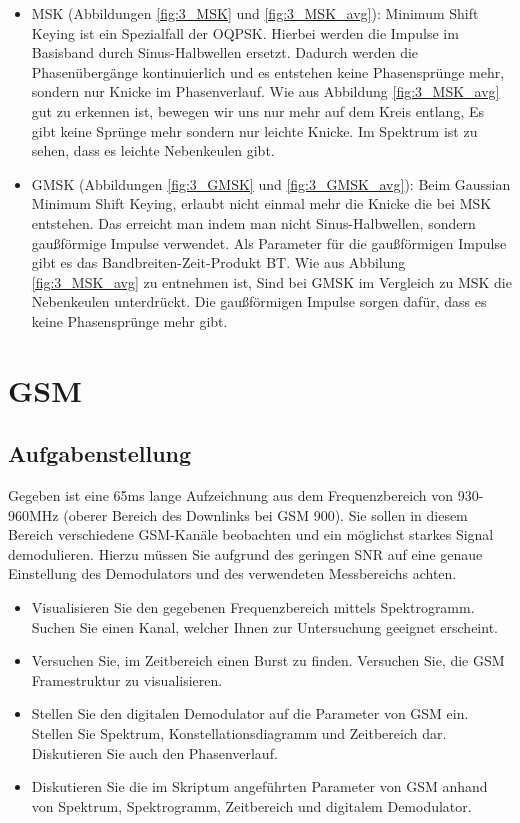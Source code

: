\documentclass[12pt,a4paper,ngerman]{article}
\begin{document}
\begin{itemize}
\item MSK (Abbildungen \ref{fig:3_MSK} und \ref{fig:3_MSK_avg}): Minimum Shift Keying ist ein Spezialfall der OQPSK. Hierbei werden die Impulse im Basisband durch Sinus-Halbwellen ersetzt. Dadurch werden die Phasenübergänge kontinuierlich und es entstehen keine Phasensprünge mehr, sondern nur Knicke im Phasenverlauf. Wie aus Abbildung \ref{fig:3_MSK_avg} gut zu erkennen ist, bewegen wir uns nur mehr auf dem Kreis entlang, Es gibt keine Sprünge mehr sondern nur leichte Knicke. Im Spektrum ist zu sehen, dass es leichte Nebenkeulen gibt.
\item GMSK (Abbildungen \ref{fig:3_GMSK} und \ref{fig:3_GMSK_avg}): Beim Gaussian Minimum Shift Keying, erlaubt nicht einmal mehr die Knicke die bei MSK entstehen. Das erreicht man indem man nicht Sinus-Halbwellen, sondern gaußförmige Impulse verwendet. Als Parameter für die gaußförmigen Impulse gibt es das Bandbreiten-Zeit-Produkt BT. Wie aus Abbilung \ref{fig:3_MSK_avg} zu entnehmen ist, Sind bei GMSK im Vergleich zu MSK die Nebenkeulen unterdrückt. Die gaußförmigen Impulse sorgen dafür, dass es keine Phasensprünge mehr gibt.
\end{itemize}


\pagebreak



\section{GSM}
\subsection{Aufgabenstellung}
Gegeben ist eine 65ms lange Aufzeichnung aus dem Frequenzbereich von 930-960MHz (oberer Bereich des Downlinks bei GSM 900). Sie sollen in diesem Bereich verschiedene GSM-Kanäle beobachten und ein möglichst starkes Signal demodulieren. Hierzu müssen Sie aufgrund des geringen SNR auf eine genaue Einstellung des Demodulators und des verwendeten Messbereichs achten. 
\begin{itemize}
\item Visualisieren Sie den gegebenen Frequenzbereich mittels Spektrogramm. Suchen Sie einen Kanal, welcher Ihnen zur Untersuchung geeignet erscheint.
\item Versuchen Sie, im Zeitbereich einen Burst zu finden. Versuchen Sie, die GSM Framestruktur zu visualisieren.
\item Stellen Sie den digitalen Demodulator auf die Parameter von GSM ein. Stellen Sie Spektrum, Konstellationsdiagramm und Zeitbereich dar. Diskutieren Sie auch den Phasenverlauf. 
\item Diskutieren Sie die im Skriptum angeführten Parameter von GSM anhand von Spektrum, Spektrogramm, Zeitbereich und digitalem Demodulator. 
\end{itemize}
\cite[19]{skript}
\end{document}
